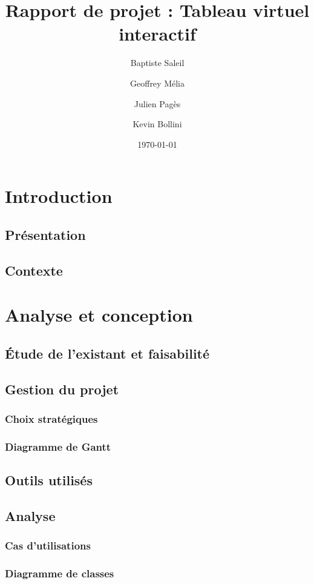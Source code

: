 \documentclass{report}
\title{Rapport de projet : Tableau virtuel interactif}
\author{Baptiste Saleil \and Geoffrey Mélia \and Julien Pagès \and Kevin Bollini}
\date{\today}
\begin{document}
	\maketitle
	\thispagestyle{empty}
	\newpage
	
	\tableofcontents
	
	\newpage
	\chapter{Introduction}
		\section{Présentation}
		\section{Contexte}
	
	\chapter{Analyse et conception}
		\section{Étude de l'existant et faisabilité}
		\section{Gestion du projet}
			\subsection{Choix stratégiques}
			\subsection{Diagramme de Gantt}
		\section{Outils utilisés}
		\section{Analyse}
			\subsection{Cas d'utilisations}
			\subsection{Diagramme de classes}
	
\end{document}
